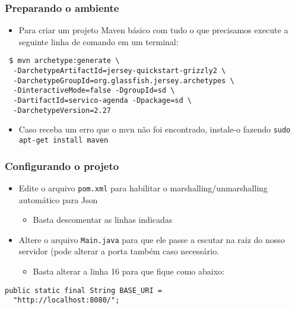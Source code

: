 \documentclass[Ligatures=TeX,table,brazil,svgnames,usetotalslideindicator,comp
ress,10pt]{beamer}
\begin{document}
\begin{frame}[fragile]
  \frametitle{Preparando o ambiente}
  \begin{itemize}
  \item Para criar um projeto Maven básico com tudo o que precisamos execute a seguinte linha de comando em um terminal:
  \end{itemize}
{\footnotesize \texttt{
    \$ mvn archetype:generate \textbackslash \\
    \mbox{ }\mbox{ }-DarchetypeArtifactId=jersey-quickstart-grizzly2 \textbackslash \\
    \mbox{ }\mbox{ }-DarchetypeGroupId=org.glassfish.jersey.archetypes \textbackslash \\
    \mbox{ }\mbox{ }-DinteractiveMode=false -DgroupId=sd \textbackslash \\
    \mbox{ }\mbox{ }-DartifactId=servico-agenda -Dpackage=sd \textbackslash \\
    \mbox{ }\mbox{ }-DarchetypeVersion=2.27
}}

\begin{itemize}
\item Caso receba um erro que o mvn não foi encontrado, instale-o
  fazendo \texttt{sudo apt-get install maven}
\end{itemize}

\end{frame}

\begin{frame}[fragile]
  \frametitle{Configurando o projeto}
  \begin{itemize}
  \item Edite o arquivo \texttt{pom.xml} para habilitar o marshalling/unmarshalling automático para Json
    \begin{itemize}
    \item Basta descomentar as linhas indicadas
    \end{itemize}
  \item Altere o arquivo \texttt{Main.java} para que ele passe a escutar na raiz do nosso servidor (pode alterar a porta também caso necessário.
    \begin{itemize}
    \item Basta alterar a linha 16 para que fique como abaixo:
    \end{itemize}
  \end{itemize}
\begin{verbatim}
public static final String BASE_URI =
  "http://localhost:8080/";
\end{verbatim}
\end{frame}
\end{document}
